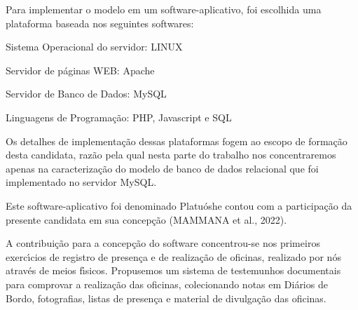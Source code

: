 \documentclass[
12pt,		%
openright,	%
twoside,  %
a4paper,			%
chapter=TITLE,		%
english,			%
french,				%
spanish,			%
brazil				%
]{USPSC-classe/USPSC_RedarTex}
\begin{document}
Para implementar o modelo em um software-aplicativo, foi escolhida uma plataforma baseada nos seguintes softwares:









\begin{alineas}
\item Sistema Operacional do servidor: LINUX
\item Servidor de p\'aginas WEB: Apache
\item Servidor de Banco de Dados: MySQL
\item Linguagens de Programa\c{c}\~ao: PHP, Javascript e SQL
\end{alineas}

Os detalhes de implementa\c{c}\~ao dessas plataformas fogem ao escopo de forma\c{c}\~ao desta candidata, raz\~ao pela qual nesta parte do trabalho nos concentraremos apenas na caracteriza\c{c}\~ao do modelo de banco de dados relacional que foi implementado no servidor MySQL.








Este software-aplicativo foi denominado \textquotedbl Platu\'osh\textquotedbl  e contou com a participa\c{c}\~ao da presente candidata em sua concep\c{c}\~ao  (MAMMANA et al., 2022).








A contribui\c{c}\~ao para a concep\c{c}\~ao do software concentrou-se nos primeiros exerc\'{\i}cios de registro de presen\c{c}a e de realiza\c{c}\~ao de oficinas, realizado por n\'os atrav\'es de meios f\'{\i}sicos. Propusemos um sistema de testemunhos documentais para comprovar a realiza\c{c}\~ao das oficinas, colecionando notas em Di\'arios de Bordo, fotografias, listas de presen\c{c}a e material de divulga\c{c}\~ao das oficinas.
\end{document}

